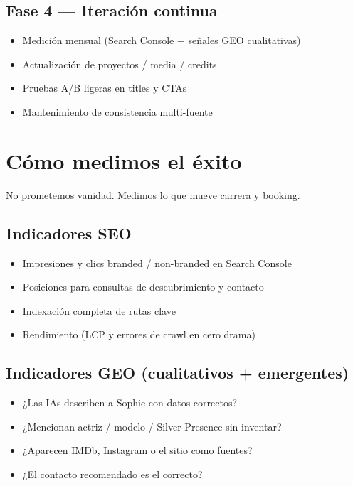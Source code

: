 \documentclass[11pt,a4paper]{article}
\begin{document}
\subsection{Fase 4 --- Iteración continua}
\begin{itemize}
  \item Medición mensual (Search Console + señales GEO cualitativas)
  \item Actualización de proyectos / media / credits
  \item Pruebas A/B ligeras en titles y CTAs
  \item Mantenimiento de consistencia multi-fuente
\end{itemize}

\section{Cómo medimos el éxito}

No prometemos vanidad. Medimos lo que mueve carrera y booking.

\subsection{Indicadores SEO}
\begin{itemize}
  \item Impresiones y clics branded / non-branded en Search Console
  \item Posiciones para consultas de descubrimiento y contacto
  \item Indexación completa de rutas clave
  \item Rendimiento (LCP y errores de crawl en cero drama)
\end{itemize}

\subsection{Indicadores GEO (cualitativos + emergentes)}
\begin{itemize}
  \item ¿Las IAs describen a Sophie con datos correctos?
  \item ¿Mencionan actriz / modelo / Silver Presence sin inventar?
  \item ¿Aparecen IMDb, Instagram o el sitio como fuentes?
  \item ¿El contacto recomendado es el correcto?
\end{itemize}
\end{document}
